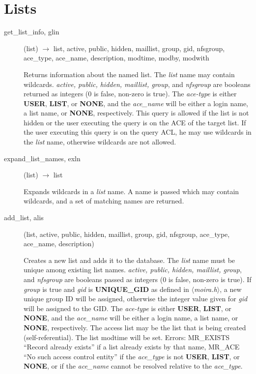 \documentclass{article}
\begin{document}
\section{Lists}

\begin{description}

\item[get\_list\_info, glin](list) $\rightarrow$ list, active, public, hidden,
maillist, group, gid, nfsgroup, ace\_type, ace\_name, description, modtime, modby,
modwith

Returns information about the named list.  The {\em list} name may
contain wildcards.  {\em active, public, hidden, maillist, group}, and
{\em nfsgroup} are booleans returned as integers (0 is false, non-zero is
true).  The {\em ace-type} is either {\bf USER}, {\bf LIST}, or {\bf NONE},
and the {\em ace\_name} will be either a login name, a list name, or
{\bf NONE}, respectively.  This query is allowed if the list is not
hidden or the user executing the query is on the ACE of the target
list.  If the user executing this query is on the query ACL, he may
use wildcards in the {\em list} name, otherwise wildcards are not
allowed.

\item[expand\_list\_names, exln](list) $\rightarrow$ list

Expands wildcards in a {\em list} name.  A name is passed which may
contain wildcards, and a set of matching names are returned.

\item[add\_list, alis](list, active, public, hidden, maillist, group, gid,
nfsgroup, ace\_type, ace\_name, description)

Creates a new list and adds it to the database. The {\em list} name
must be unique among existing list names. {\em active, public, hidden,
maillist, group}, and {\em nfsgroup} are booleans passed as integers (0 is
false, non-zero is true). If {\em group} is true and {\em gid} is {\bf
UNIQUE\_GID} as defined in {\em $\langle$moira.h$\rangle$}, a new
unique group ID will be assigned, otherwise the integer value given
for {\em gid} will be assigned to the GID. The {\em ace-type} is
either {\bf USER}, {\bf LIST}, or {\bf NONE}, and the {\em ace\_name}
will be either a login name, a list name, or {\bf NONE}, respectively.
The access list may be the list that is being created
(self-referential). The list modtime will be set. Errors: MR\_EXISTS
``Record already exists'' if a list already exists by that name, MR\_ACE
``No such access control entity'' if the {\em ace\_type} is not {\bf
USER}, {\bf LIST}, or {\bf NONE}, or if the {\em ace\_name} cannot be
resolved relative to the {\em ace\_type}.


\end{description}
\end{document}
